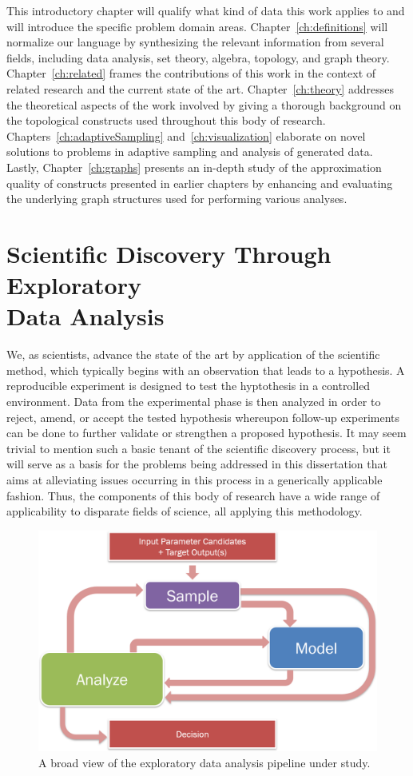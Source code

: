 This introductory chapter will qualify what kind of data this work applies to and will introduce the specific problem domain areas.
%
Chapter~\ref{ch:definitions} will normalize our language by synthesizing the relevant information from several fields, including data analysis, set theory, algebra, topology, and graph theory.
%
Chapter~\ref{ch:related} frames the contributions of this work in the context of related research and the current state of the art.
%
Chapter~\ref{ch:theory} addresses the theoretical aspects of the work involved by giving a thorough background on the topological constructs used throughout this body of research.
%
Chapters~\ref{ch:adaptiveSampling} and~\ref{ch:visualization} elaborate on novel solutions to problems in adaptive sampling and analysis of generated data.
%
Lastly, Chapter~\ref{ch:graphs} presents an in-depth study of the approximation quality of constructs presented in earlier chapters by enhancing and evaluating the underlying graph structures used for performing various analyses.

\section{Scientific Discovery Through Exploratory\\Data Analysis}

We, as scientists, advance the state of the art by application of the scientific method, which typically begins with an observation that leads to a hypothesis.
%
A reproducible experiment is designed to test the hyptothesis in a controlled environment.
%
Data from the experimental phase is then analyzed in order to reject, amend, or accept the tested hypothesis whereupon follow-up experiments can be done to further validate or strengthen a proposed hypothesis.
%
It may seem trivial to mention such a basic tenant of the scientific discovery process, but it will serve as a basis for the problems being addressed in this dissertation that aims at alleviating issues occurring in this process in a generically applicable fashion.
%
Thus, the components of this body of research have a wide range of applicability to disparate fields of science, all applying this methodology.

\begin{figure}[t]
  \centering
  \includegraphics[width=.65\textwidth]{figs/chap1/pipeline}
  \caption[Data collection cycle for scientific discovery]{A broad view of the exploratory data analysis pipeline under study.}
  \label{fig:dataCycle}
\end{figure}

